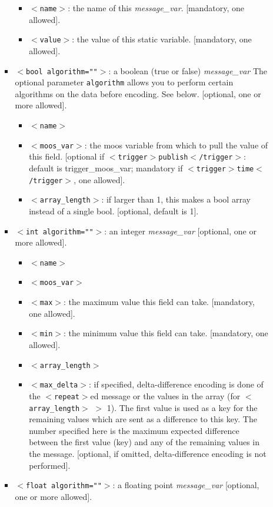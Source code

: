 \documentclass[11pt, letterpaper, oneside]{memoir}
\newcommand{\xmltag}[1]{\texttt{$<$#1$>$}}
\begin{document}
\begin{itemize}
\begin{itemize}
\begin{itemize}
\begin{itemize}
\item \xmltag{name}: the name of this \textit{message\_var}. [mandatory, one allowed].
\item \xmltag{value}: the value of this static variable. [mandatory, one allowed].
\end{itemize}
\item \xmltag{bool algorithm=""}: a boolean (true or false) \textit{message\_var}  The optional parameter \verb|algorithm| allows you to perform certain algorithms on the data before encoding. See below. [optional, one or more allowed]. 
\begin{itemize}
\item \xmltag{name}
\item \xmltag{moos\_var}: the moos variable from which to pull the value of this field. [optional if \xmltag{trigger$>$publish$<$/trigger}: default is trigger\_moos\_var; mandatory if \xmltag{trigger$>$time$<$/trigger}, one allowed]. 
\item \xmltag{array\_length}: if larger than 1, this makes a bool array instead of a single bool. [optional, default is  1].
\end{itemize}
\item \xmltag{int algorithm=""}: an integer \textit{message\_var} [optional, one or more allowed]. 
\begin{itemize}
\item \xmltag{name}
\item \xmltag{moos\_var}
\item \xmltag{max}: the maximum value this field can take. [mandatory, one allowed].
\item \xmltag{min}: the minimum value this field can take. [mandatory, one allowed].
\item \xmltag{array\_length}
\item \xmltag{max\_delta}: if specified, delta-difference encoding is done of the \xmltag{repeat}ed message or the values in the array (for \xmltag{array\_length} $>$ 1). The first value is used as a key for the remaining values which are sent as a difference to this key. The number specified here is the maximum expected difference between the first value (key) and any of the remaining values in the message. [optional, if omitted, delta-difference encoding is not performed].
\end{itemize}
\item \xmltag{float algorithm=""}: a floating point \textit{message\_var} [optional, one or more allowed].

\end{itemize}
\end{itemize}
\end{itemize}
\end{document}
